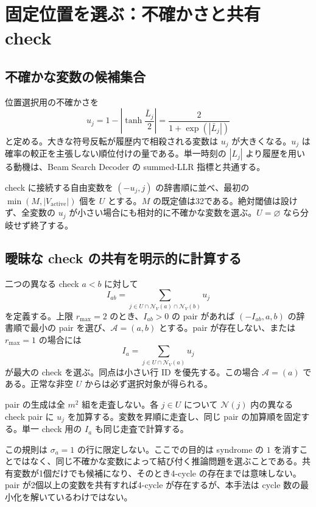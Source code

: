\documentclass[a4paper,11pt]{ltjsarticle}
\numberwithin{equation}{section}
\theoremstyle{definition}
\newcommand{\N}{\mathcal N}
\newcommand{\A}{\mathcal A}
\begin{document}
\section{固定位置を選ぶ：不確かさと共有 check}
\subsection{不確かな変数の候補集合}
位置選択用の不確かさを
\begin{equation}
 u_j=1-\left|\tanh\frac{\bar L_j}{2}\right|
     =\frac{2}{1+\exp(|\bar L_j|)}
 \label{eq:uncertainty}
\end{equation}
と定める。大きな符号反転が履歴内で相殺される変数は $u_j$ が大きくなる。$u_j$ は確率の較正を主張しない順位付けの量である。単一時刻の $|L_j|$ より履歴を用いる動機は、Beam Search Decoder の summed-LLR 指標と共通する\cite{beam}。

check に接続する自由変数を $(-u_j,j)$ の辞書順に並べ、最初の $\min(M,|V_{\mathrm{active}}|)$ 個を $U$ とする。$M$ の既定値は32である。絶対閾値は設けず、全変数の $u_j$ が小さい場合にも相対的に不確かな変数を選ぶ。$U=\varnothing$ なら分岐せず終了する。

\subsection{曖昧な check の共有を明示的に計算する}
二つの異なる check $a<b$ に対して
\begin{equation}
 I_{ab}=\sum_{j\in U\cap\N_V(a)\cap\N_V(b)}u_j
 \label{eq:overlap}
\end{equation}
を定義する。上限 $r_{\max}=2$ のとき、$I_{ab}>0$ の pair があれば $(-I_{ab},a,b)$ の辞書順で最小の pair を選び、$\A=(a,b)$ とする。pair が存在しない、または $r_{\max}=1$ の場合には
\begin{equation}
 I_a=\sum_{j\in U\cap\N_V(a)}u_j
 \label{eq:single}
\end{equation}
が最大の check を選ぶ。同点は小さい行 ID を優先する。この場合 $\A=(a)$ である。正常な非空 $U$ からは必ず選択対象が得られる。

pair の生成は全 $m^2$ 組を走査しない。各 $j\in U$ について $\N(j)$ 内の異なる check pair に $u_j$ を加算する。変数を昇順に走査し、同じ pair の加算順を固定する。単一 check 用の $I_a$ も同じ走査で計算する。

この規則は $\sigma_a=1$ の行に限定しない。ここでの目的は syndrome の $1$ を消すことではなく、同じ不確かな変数によって結び付く推論問題を選ぶことである。共有変数が1個だけでも候補になり、そのとき4-cycle の存在までは意味しない。pair が2個以上の変数を共有すれば4-cycle が存在するが、本手法は cycle 数の最小化を解いているわけではない。
\end{document}
